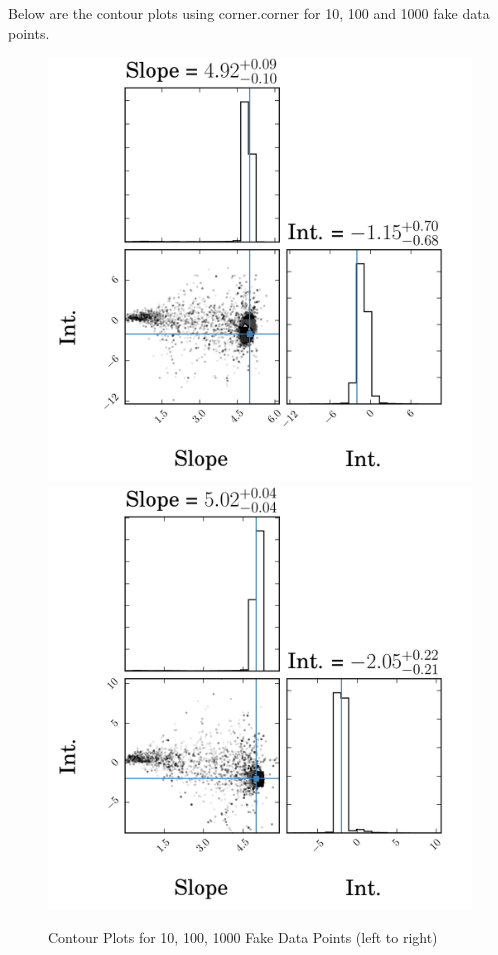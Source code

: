 \documentclass[english,12pt]{article}
\begin{document}
Below are the contour plots using corner.corner for 10, 100 and 1000 fake data points.

\begin{figure}[H]
\caption{Contour Plots for 10, 100, 1000 Fake Data Points (left to right)}
  \includegraphics[width=\linewidth]{corner_10_data_points_emcee.png}
\endminipage\hfill
{}
  \includegraphics[width=\linewidth]{corner_100_data_points_emcee.png}

\end{figure}
\end{document}
